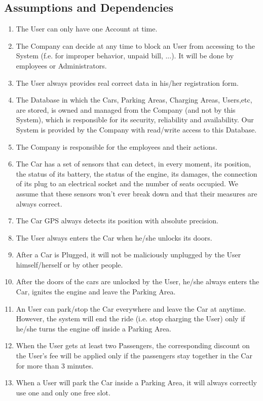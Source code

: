 \subsection{Assumptions and Dependencies}
\begin{enumerate}
	\item The User can only have one Account at time.
	\item The Company can decide at any time to block an User from accessing to the System (f.e. for improper behavior, unpaid bill, ...). It will be done by employees or Administrators.
	\item The User always provides real correct data in his/her registration form.
	\item The Database in which the Cars, Parking Areas, Charging Areas, Users,etc, are stored, is owned and managed from the Company (and not by this System), which is responsible for its security, reliability and availability. Our System is provided by the Company with read/write access to this Database.
	\item The Company is responsible for the employees and their actions.
	\item The Car has a set of sensors that can detect, in every moment, its position, the status of its battery, the status of the engine, its damages, the connection of its plug to an electrical socket and the number of seats occupied. We assume that these sensors won't ever break down and that their measures are always correct.
	\item The Car GPS always detects its position with absolute precision.
	\item The User always enters the Car when he/she unlocks its doors.	
	\item After a Car is Plugged, it will not be maliciously unplugged by the User himself/herself or by other people.
	\item After the doors of the cars are unlocked by the User, he/she always enters the Car, ignites the engine and leave the Parking Area.
	\item An User can park/stop the Car everywhere and leave the Car at anytime. However, the system will end the ride (i.e. stop charging the User) only if he/she turns the engine off inside a Parking Area.
	\item When the User gets at least two Passengers, the corresponding discount on the User's fee will be applied only if the passengers stay together in the Car for more than 3 minutes. 
	\item When a User will park the Car inside a Parking Area, it will always correctly use one and only one free slot.

\end{enumerate}

